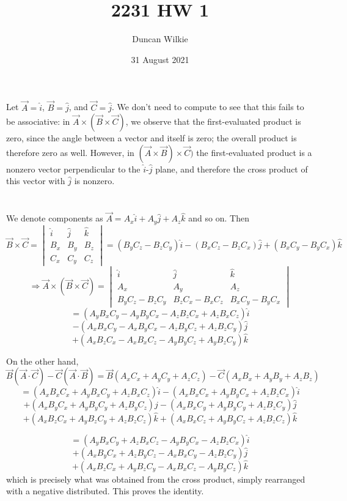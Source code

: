 \documentclass[letterpaper, 11pt]{article}
\title{2231 HW 1}
\author{Duncan Wilkie}
\date{31 August 2021}
\begin{document}
\maketitle

\section{}
Let $\vec{A}=\hat{i}$, $\vec{B}=\hat{j}$, and $\vec{C}=\hat{j}$. We don't need to compute to see that this fails to be associative: in $\vec{A}\times(\vec{B}\times\vec{C})$, we observe that the first-evaluated product is zero, since the angle between a vector and itself is zero; the overall product is therefore zero as well. However, in $(\vec{A}\times\vec{B})\times\vec{C})$ the first-evaluated product is a nonzero vector perpendicular to the $\hat{i}$-$\hat{j}$ plane, and therefore the cross product of this vector with $\hat{j}$ is nonzero.
\section{}
We denote components as $\vec{A}=A_x\hat{i}+A_y\hat{j}+A_z\hat{k}$ and so on. Then
\[\vec{B}\times\vec{C}=\begin{vmatrix} \hat{i} & \hat{j} & \hat{k}\\ B_x & B_y & B_z \\ C_x & C_y & C_z \end{vmatrix}=(B_yC_z-B_zC_y)\hat{i}-(B_xC_z-B_zC_x)\hat{j}+(B_xC_y-B_yC_x)\hat{k}\]
\[\Rightarrow \vec{A}\times(\vec{B}\times\vec{C})=\begin{vmatrix} \hat{i} & \hat{j} & \hat{k}\\ A_x & A_y & A_z\\ B_yC_z-B_zC_y & B_zC_x-B_xC_z & B_xC_y-B_yC_x\end{vmatrix}\]
\[=(A_yB_xC_y-A_yB_yC_x-A_zB_zC_x+A_zB_xC_z)\hat{i}\]\[-(A_xB_xC_y-A_xB_yC_x-A_zB_yC_z+A_zB_zC_y)\hat{j}\]\[+(A_xB_zC_x-A_xB_xC_z-A_yB_yC_z+A_yB_zC_y)\hat{k}\]

On the other hand, \[\vec{B}(\vec{A}\cdot\vec{C})-\vec{C}(\vec{A}\cdot\vec{B}) =\vec{B}(A_xC_x+A_yC_y+A_zC_z)-\vec{C}(A_xB_x+A_yB_y+ A_zB_z)\]
\[=(A_xB_xC_x+A_yB_xC_y+A_zB_xC_z)\hat{i}-(A_xB_xC_x+A_yB_yC_x + A_zB_zC_x)\hat{i}\]
\[+(A_xB_yC_x+A_yB_yC_y+A_zB_yC_z)\hat{j}-(A_xB_xC_y+A_yB_yC_y+A_zB_zC_y)\hat{j}\]
\[+(A_xB_zC_x+A_yB_zC_y+A_zB_zC_z)\hat{k}+(A_xB_xC_z+A_yB_yC_z+A_zB_zC_z)\hat{k}\]

\[=(A_yB_xC_y + A_zB_xC_z-A_yB_yC_x-A_zB_zC_x)\hat{i}\]
\[+(A_xB_yC_x+A_zB_yC_z-A_xB_xC_y-A_zB_zC_y)\hat{j}\]
\[+(A_xB_zC_x+A_yB_zC_y-A_xB_xC_z-A_yB_yC_z)\hat{k}\]
which is precisely what was obtained from the cross product, simply rearranged with a negative distributed. This proves the identity.
\end{document}
